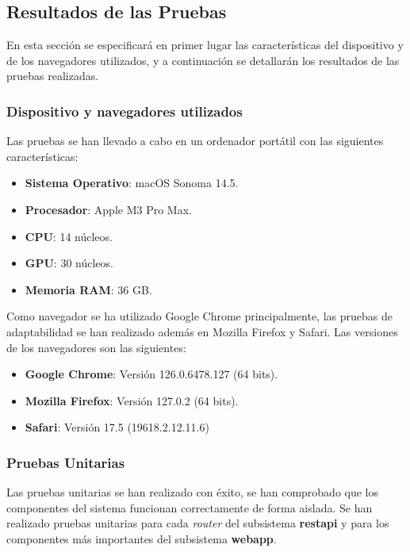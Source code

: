\subsection{Resultados de las Pruebas}
En esta sección se especificará en primer lugar las características del dispositivo y de los navegadores utilizados, y a continuación se detallarán los resultados de las pruebas realizadas.

\subsubsection{Dispositivo y navegadores utilizados}
Las pruebas se han llevado a cabo en un ordenador portátil con las siguientes características:
\begin{itemize}
    \item \textbf{Sistema Operativo}: macOS Sonoma 14.5.
    \item \textbf{Procesador}: Apple M3 Pro Max.
    \item \textbf{CPU}: 14 núcleos.
    \item \textbf{GPU}: 30 núcleos.
    \item \textbf{Memoria RAM}: 36 GB.
\end{itemize}

Como navegador se ha utilizado Google Chrome principalmente, las pruebas de adaptabilidad se han realizado además en Mozilla Firefox y Safari.
Las versiones de los navegadores son las siguientes:
\begin{itemize}
    \item \textbf{Google Chrome}: Versión 126.0.6478.127 (64 bits).
    \item \textbf{Mozilla Firefox}: Versión 127.0.2 (64 bits).
    \item \textbf{Safari}: Versión 17.5 (19618.2.12.11.6)
\end{itemize}


\subsubsection{Pruebas Unitarias}
Las pruebas unitarias se han realizado con éxito, se han comprobado que los componentes del sistema funcionan correctamente de forma aislada.
Se han realizado pruebas unitarias para cada \textit{router} del subsistema \textbf{restapi} y para los componentes más importantes del subsistema \textbf{webapp}. 

